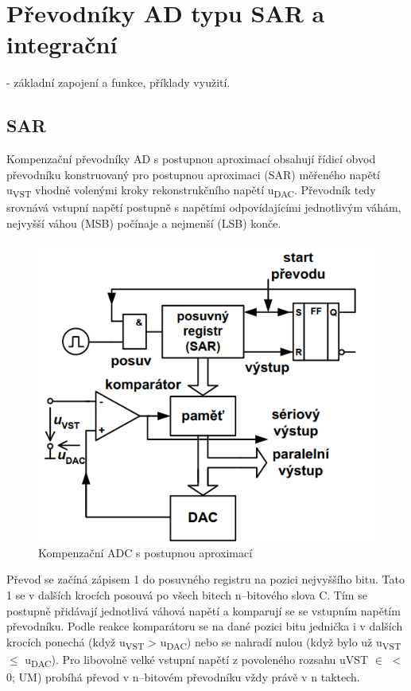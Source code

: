 \section{Převodníky AD typu SAR a integrační}
- základní zapojení a funkce, příklady využití.

\subsection{SAR}
Kompenzační převodníky AD s postupnou aproximací obsahují řídicí obvod převodníku konstruovaný pro postupnou aproximaci (SAR) měřeného napětí u\textsubscript{VST} vhodně volenými kroky rekonstrukčního napětí u\textsubscript{DAC}. Převodník tedy srovnává vstupní napětí postupně s napětími odpovídajícími jednotlivým váhám, nejvyšší váhou (MSB) počínaje a nejmenší (LSB) konče.
\begin{figure}[h]
   \begin{center}
     \includegraphics[scale=0.6]{images/ADCkomp.png}
   \end{center}
   \caption{Kompenzační ADC s postupnou aproximací}
\end{figure}

Převod se začíná zápisem 1 do posuvného registru na pozici nejvyššího bitu. Tato 1 se v dalších krocích posouvá po všech bitech n–bitového slova C. Tím se postupně přidávají jednotlivá váhová napětí a komparují se se vstupním napětím převodníku. Podle reakce komparátoru se na dané pozici bitu jednička i v dalších krocích ponechá (když u\textsubscript{VST} > u\textsubscript{DAC}) nebo se nahradí nulou (když bylo už u\textsubscript{VST} $\leq$ u\textsubscript{DAC}). Pro libovolně velké vstupní napětí z povoleného rozsahu uVST $\in$ $<$ 0; UM) probíhá převod v n–bitovém převodníku vždy právě v n taktech.

